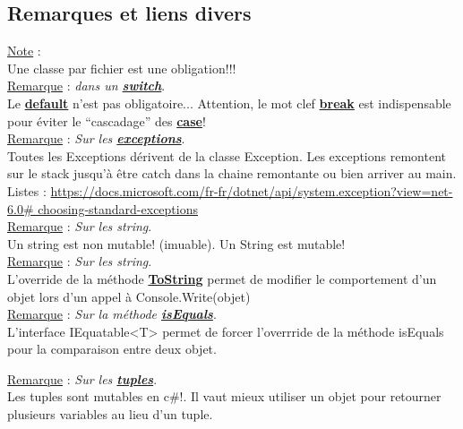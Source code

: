\documentclass[a4paper,12pt,twoside]{article}
\newcommand{\urlcolor}{magenta}  %
\newcommand{\keycolor}{purple} %
\newcommand{\incode}[1]{{\footnotesize\ttfamily #1}} %
\newcommand{\rem}[2]{\noindent\underline{Remarque} : \textit{#1}.\\ \indent #2}
\newcommand{\note}[1]{\noindent\underline{Note} : \\ \indent #1}
\newcommand{\keyref}[2]{\hypersetup{urlcolor=\keycolor} \href{#1}{\textbf{#2}}\hypersetup{urlcolor=\urlcolor}}
\begin{document}
\subsection{Remarques et liens divers}

\note{Une classe par fichier est une obligation!!!}\\

\rem{dans un \keyref{https://docs.microsoft.com/fr-fr/dotnet/csharp/language-reference/operators/switch-expression}{switch}}{Le \keyref{https://docs.microsoft.com/fr-fr/dotnet/csharp/language-reference/keywords/default}{default} n'est pas obligatoire... Attention, le mot clef \keyref{https://docs.microsoft.com/fr-fr/dotnet/csharp/language-reference/statements/jump-statements\#the-break-statement}{break} est indispensable pour éviter le ``cascadage'' des \keyref{https://docs.microsoft.com/fr-fr/dotnet/csharp/language-reference/statements/selection-statements}{case}!}\\

\rem{Sur les \keyref{https://docs.microsoft.com/fr-fr/dotnet/csharp/fundamentals/exceptions/}{exceptions}}{Toutes les Exceptions dérivent de la classe Exception. Les exceptions remontent sur le stack jusqu'à être catch dans la chaine remontante ou bien arriver au main. Listes : \url{https://docs.microsoft.com/fr-fr/dotnet/api/system.exception?view=net-6.0\# choosing-standard-exceptions}}\\

\rem{Sur les string}{Un \incode{string} est non mutable! (imuable). Un \incode{String} est mutable!}\\

\rem{Sur les string}{L'override de la méthode \keyref{https://docs.microsoft.com/fr-fr/dotnet/api/system.object.tostring?view=net-6.0}{ToString} permet de modifier le comportement d'un objet lors d'un appel à \incode{Console.Write(objet)}}\\

\rem{Sur la méthode \keyref{https://docs.microsoft.com/en-us/dotnet/api/system.object.equals?view=net-6.0}{isEquals}}{ L'interface \incode{IEquatable<T>} permet de forcer l'overrride de la méthode \incode{isEquals} pour la comparaison entre deux objet.}

\rem{Sur les \keyref{https://docs.microsoft.com/fr-fr/dotnet/csharp/language-reference/builtin-types/value-tuples}{tuples}}{Les tuples sont mutables en c\#!. Il vaut mieux utiliser un objet pour retourner plusieurs variables au lieu d'un tuple.}\\
\end{document}
